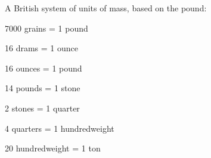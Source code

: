 A British system of units of mass, based on the pound:
\par
7000 grains = 1 pound
\par
16 drams = 1 ounce
\par
16 ounces = 1 pound
\par
14 pounds = 1 stone
\par
2 stones = 1 quarter
\par
4 quarters = 1 hundredweight
\par
20 hundredweight = 1 ton